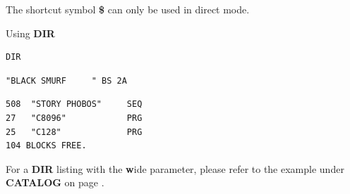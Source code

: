 \begin{description}[leftmargin=2cm,style=nextline]
   The shortcut symbol {\bf \$} can only be used in direct mode.

\item [Examples:] Using {\bf DIR}

\begin{tcolorbox}[colback=black,coltext=white]
\verbatimfont{\codefont}
\begin{verbatim}
DIR
\end{verbatim}
\selectfont{\codefont 0}
\begin{tcolorbox}[colback=white,coltext=black,arc=0mm,boxrule=0mm,
       left*=0.5mm,right*=0mm,top=0mm,bottom=0mm,nobeforeafter,
       left skip=0.5mm,
       width=28mm,height=3mm,valign=center]
\begin{verbatim}
"BLACK SMURF     " BS 2A
\end{verbatim}
\end{tcolorbox}
\begin{verbatim}
508  "STORY PHOBOS"     SEQ
27   "C8096"            PRG
25   "C128"             PRG
104 BLOCKS FREE.
\end{verbatim}
\end{tcolorbox}

For a {\bf DIR} listing with the {\bf w}ide parameter, please refer to the example under {\bf CATALOG}
on page \pageref{3columndirlisting}.

\end{description}


\newpage
